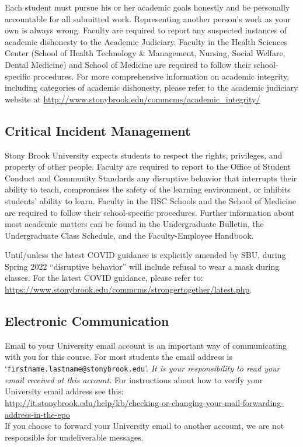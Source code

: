\documentclass[10pt]{article}
\begin{document}
Each student must pursue his or her academic goals honestly
and be personally accountable for all submitted work. Representing
another person's work as your own is always wrong. Faculty are
required to report any suspected instances of academic dishonesty to
the Academic Judiciary. Faculty in the Health Sciences Center (School
of Health Technology \& Management, Nursing, Social Welfare, Dental
Medicine) and School of Medicine are required to follow their
school-specific procedures. For more comprehensive information on
academic integrity, including categories of academic dishonesty,
please refer to the academic judiciary website at
\url{http://www.stonybrook.edu/commcms/academic\_integrity/}

\subsection*{Critical Incident Management}

Stony Brook University expects students to respect the rights,
privileges, and property of other people. Faculty are required to
report to the Office of Student Conduct and Community Standards any
disruptive behavior that interrupts their ability to teach,
compromises the safety of the learning environment, or inhibits
students' ability to learn. Faculty in the HSC Schools and the School
of Medicine are required to follow their school-specific
procedures. Further information about most academic matters can be
found in the Undergraduate Bulletin, the Undergraduate Class Schedule,
and the Faculty-Employee Handbook.

Until/unless the latest COVID guidance is explicitly amended by SBU,
during Spring 2022 ``disruptive behavior'' will include refusal to wear
a mask during classes.  For the latest COVID guidance, please refer to:
\url{https://www.stonybrook.edu/commcms/strongertogether/latest.php}.


\subsection*{Electronic Communication}

Email to your University email account is an important way
of communicating with you for this course.  For most students the
email address is `{\tt firstname.lastname@stonybrook.edu}'.
{\em It is your responsibility to read your email received at this
  account.}  For instructions about how to verify your University
email address see this: \\
{\footnotesize \url{http://it.stonybrook.edu/help/kb/checking-or-changing-your-mail-forwarding-address-in-the-epo}}\\
If you choose to forward your University email to another account, we
are not responsible for undeliverable messages.
\end{document}
